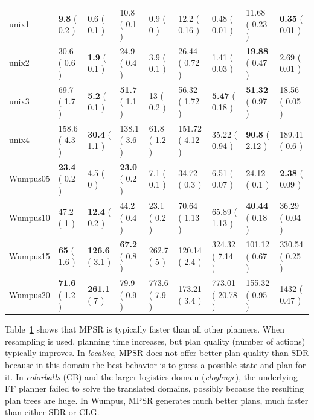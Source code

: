 \documentclass[letterpaper]{article}
\numberwithin{equation}{section}	%
\begin{document}
\begin{table}[htb]
\begin{tabular}{|l||l|l||l|l||l|l||l|l|}
unix1	&	\textbf{9.8}	(	0.2	)&	0.6	(	0.1	)&			10.8	(	0.1	)&	0.9	(	0	)&		12.2	(	0.16	)&	0.48	(	0.01	)&		11.68	(	 0.23	)&	\textbf{0.35}	(	 0.01 )	\\
unix2	&	30.6	(	0.6	)&	\textbf{1.9}	(	0.1	)&			24.9	(	0.4	)&	3.9	(	0.1	)&		26.44	(	0.72	)&	1.41	(	0.03	)&		 \textbf{19.88}	(	0.47	)&	2.69	 (	0.01	)\\
unix3	&	69.7	(	1.7	)&	\textbf{5.2}	(	0.1	)&			\textbf{51.7}	(	1.1	)&	13	(	0.2	)&		56.32	(	1.72	)&	\textbf{5.47}	(	0.18	)&		 \textbf{51.32}	(	0.97	 )&	18.56	(	0.05	)\\
unix4	&	158.6	(	4.3	)&	\textbf{30.4}	(	1.1	)&			138.1	(	3.6	)&	61.8	(	1.2	)&		151.72	(	4.12	)&	35.22	(	0.94	)&		 \textbf{90.8}	(	2.12	)&	 189.41	(	0.6	)\\
\hline
																																					
Wumpus05	&	\textbf{23.4}	(	0.2	)&	4.5	(	0	)&			\textbf{23.0}	(	0.2	)&	7.1	(	0.1	)&		34.72	(	0.3	)&	6.51	(	0.07	)&		24.12	 (	0.1	)&	\textbf{2.38}	 (	0.09	)\\
Wumpus10	&	47.2	(	1	)&	\textbf{12.4}	(	0.2	)&			44.2	(	0.4	)&	23.1	(	0.2	)&		70.64	(	1.13	)&	65.89	(	1.13	)&		 \textbf{40.44}	(	0.18	)&	 36.29	(	0.04	 )\\
Wumpus15	&	\textbf{65}	(	1.6	)&	\textbf{126.6}	(	3.1	)&			\textbf{67.2}	(	0.8	)&	262.7	(	5	)&		120.14	(	2.4	)&	324.32	(	7.14	)&		 101.12	(	0.67	)&	 330.54	(	0.25	 )\\
Wumpus20	&	\textbf{71.6}	(	1.2	)&	\textbf{261.1}	(	7	)&			79.9	(	0.9	)&	773.6	(	7.9	)&		173.21	(	3.4	)&	773.01	(	20.78	)&		 155.32	(	0.95	)&	1432	 (	0.47	 )\\
\hline
\end{tabular}
\label{tbl:Results}
\end{table}

Table~\ref{tbl:Results} shows that MPSR is typically faster than all other planners. When resampling is used,  planning time increases, but plan quality (number of actions) typically improves. In \emph{localize}, MPSR does not offer better plan quality than SDR because in this domain the best behavior is to guess a possible state and plan for it. In \emph{colorballs} (CB) and the larger logistics domain (\emph{cloghuge}), the underlying FF planner failed to solve the translated domains, possibly because the resulting plan trees are huge. In Wumpus, MPSR generates much better plans, much faster than either SDR or CLG.
\end{document}
